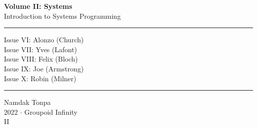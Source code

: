 \documentclass{article}
\begin{document}
\begin{titlepage}
    \centering
    \vspace*{0.5in}
    \Huge
    \textbf{Volume II: Systems} \\
    \LARGE
    Introduction to Systems Programming \\
    \vspace{1.5in}
    \flushleft
    \small
    \vspace{-2mm} \rule{\textwidth}{0.4pt}
    Issue VI: Alonzo (Church) \\
    Issue VII: Yves (Lafont) \\
    Issue VIII: Felix (Bloch) \\
    Issue IX: Joe (Armstrong) \\
    Issue X: Robin (Milner) \\
    \vspace{-2mm} \rule{\textwidth}{0.4pt}
    \centering
    \vfill
    \large
    Namdak Tonpa \\
    \Large
    2022 $\cdot$ Groupoid Infinity \\
    II
\end{titlepage}

\tableofcontents
\newif\ifincludeTOC
\includeTOCfalse

\newpage \begin{standalone}  \end{standalone} %
\newpage \begin{standalone}    \end{standalone} %
\newpage \begin{standalone}   \end{standalone} %
\newpage \begin{standalone}     \end{standalone} %
\newpage \begin{standalone}   \end{standalone} %
\end{document}
